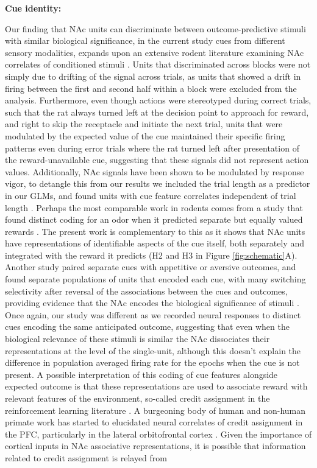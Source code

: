 \documentclass[11pt]{article}
\let\cite=\citep
\begin{document}
{{\bf Cue identity:}

Our finding that NAc units can discriminate between outcome-predictive stimuli with similar biological significance, in the current study cues from different sensory modalities, expands upon an extensive rodent literature examining NAc correlates of conditioned stimuli \cite{Ambroggi2008,Atallah2014,Bissonette2013,Cooch2015,Day2006,Dejean2017,Goldstein2012,Ishikawa2008,Lansink2012,McGinty2013,Nicola2004,Roesch2009a,Roitman2005,Saddoris2011,Setlow2003,Sugam2014,West2016,Yun2004}. Units that discriminated across blocks were not simply due to drifting of the signal across trials, as units that showed a drift in firing between the first and second half within a block were excluded from the analysis. Furthermore, even though actions were stereotyped during correct trials, such that the rat always turned left at the decision point to approach for reward, and right to skip the receptacle and initiate the next trial, units that were modulated by the expected value of the cue maintained their specific firing patterns even during error trials where the rat turned left after presentation of the reward-unavailable cue, suggesting that these signals did not represent action values. Additionally, NAc signals have been shown to be modulated by response vigor, to detangle this from our results we included the trial length as a predictor in our GLMs, and found units with cue feature correlates independent of trial length \cite{McGinty2013}. Perhaps the most comparable work in rodents comes from a study that found distinct coding for an odor when it predicted separate but equally valued rewards \cite{Cooch2015}. The present work is complementary to this as it shows that NAc units have representations of identifiable aspects of the cue itself, both separately and integrated with the reward it predicts (H2 and H3 in Figure \ref{fig:schematic}A). Another study paired separate cues with appetitive or aversive outcomes, and found separate populations of units that encoded each cue, with many switching selectivity after reversal of the associations between the cues and outcomes, providing evidence that the NAc encodes the biological significance of stimuli \cite{Setlow2003}. Once again, our study was different as we recorded neural responses to distinct cues encoding the same anticipated outcome, suggesting that even when the biological relevance of these stimuli is similar the NAc dissociates their representations at the level of the single-unit, although this doesn’t explain the difference in population averaged firing rate for the epochs when the cue is not present. A possible interpretation of this coding of cue features alongside expected outcome is that these representations are used to associate reward with relevant features of the environment, so-called credit assignment in the reinforcement learning literature \cite{sutton1998}. A burgeoning body of human and non-human primate work has started to elucidated neural correlates of credit assignment in the PFC, particularly in the lateral orbitofrontal cortex \cite{Akaishi2016,Asaad2017,Chau2015,Noonan2017}. Given the importance of cortical inputs in NAc associative representations, it is possible that information related to credit assignment is relayed from }
\end{document}
